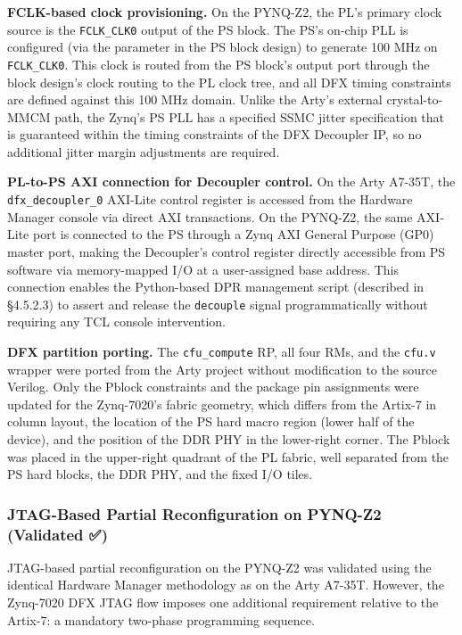 \textbf{FCLK-based clock provisioning.} On the PYNQ-Z2, the PL's primary clock source is the \texttt{FCLK\_CLK0} output of the PS block. The PS's on-chip PLL is configured (via the  parameter in the PS block design) to generate 100 MHz on \texttt{FCLK\_CLK0}. This clock is routed from the PS block's output port through the block design's clock routing to the PL clock tree, and all DFX timing constraints are defined against this 100 MHz domain. Unlike the Arty's external crystal-to-MMCM path, the Zynq's PS PLL has a specified SSMC jitter specification that is guaranteed within the timing constraints of the DFX Decoupler IP, so no additional jitter margin adjustments are required.

\textbf{PL-to-PS AXI connection for Decoupler control.} On the Arty A7-35T, the \texttt{dfx\_decoupler\_0} AXI-Lite control register is accessed from the Hardware Manager console via direct AXI transactions. On the PYNQ-Z2, the same AXI-Lite port is connected to the PS through a Zynq AXI General Purpose (GP0) master port, making the Decoupler's control register directly accessible from PS software via memory-mapped I/O at a user-assigned base address. This connection enables the Python-based DPR management script (described in §4.5.2.3) to assert and release the \texttt{decouple} signal programmatically without requiring any TCL console intervention.

\textbf{DFX partition porting.} The \texttt{cfu\_compute} RP, all four RMs, and the \texttt{cfu.v} wrapper were ported from the Arty project without modification to the source Verilog. Only the Pblock constraints and the package pin assignments were updated for the Zynq-7020's fabric geometry, which differs from the Artix-7 in column layout, the location of the PS hard macro region (lower half of the device), and the position of the DDR PHY in the lower-right corner. The Pblock was placed in the upper-right quadrant of the PL fabric, well separated from the PS hard blocks, the DDR PHY, and the fixed I/O tiles.

\subsubsection{JTAG-Based Partial Reconfiguration on PYNQ-Z2 (Validated ✅)}

JTAG-based partial reconfiguration on the PYNQ-Z2 was validated using the identical Hardware Manager methodology as on the Arty A7-35T. However, the Zynq-7020 DFX JTAG flow imposes one additional requirement relative to the Artix-7: a mandatory two-phase programming sequence.

